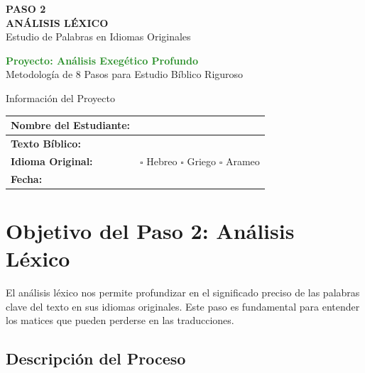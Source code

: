 \documentclass[11pt,a4paper]{article}
\begin{document}
\begin{center}
    {\Huge\color{forestgreen}\textbf{PASO 2}}\\[0.5cm]
    {\Large\color{sagegreen}\textbf{ANÁLISIS LÉXICO}}\\[0.3cm]
    {\large\color{papergray}Estudio de Palabras en Idiomas Originales}\\[1cm]
    
    \begin{tcolorbox}[colback=olivegreen!10, colframe=olivegreen, width=0.8\textwidth]
        \centering
        \textcolor{forestgreen}{\textbf{Proyecto: Análisis Exegético Profundo}}\\
        \textcolor{papergray}{Metodología de 8 Pasos para Estudio Bíblico Riguroso}
    \end{tcolorbox}
\end{center}

\vspace{1cm}

\begin{infobox}{Información del Proyecto}
\begin{tabularx}{\textwidth}{|X|X|}
\hline
\textbf{Nombre del Estudiante:} & \underline{\hspace{6cm}} \\[0.8cm]
\hline
\textbf{Texto Bíblico:} & \underline{\hspace{6cm}} \\[0.8cm]
\hline
\textbf{Idioma Original:} & $\square$ Hebreo \quad $\square$ Griego \quad $\square$ Arameo \\[0.8cm]
\hline
\textbf{Fecha:} & \underline{\hspace{6cm}} \\[0.8cm]
\hline
\end{tabularx}
\end{infobox}

\section{Objetivo del Paso 2: Análisis Léxico}

El análisis léxico nos permite profundizar en el significado preciso de las palabras clave del texto en sus idiomas originales. Este paso es fundamental para entender los matices que pueden perderse en las traducciones.

\subsection{Descripción del Proceso}
\end{document}
